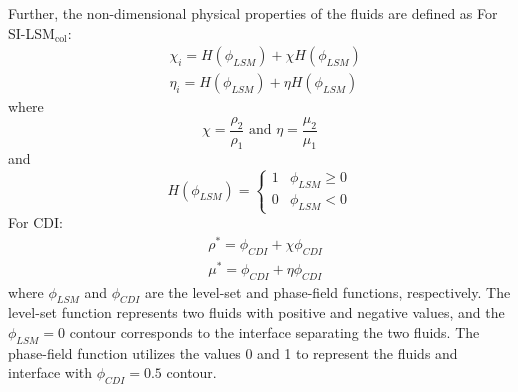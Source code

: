 \documentclass[a4paper,fleqn]{cas-sc}
\begin{document}
	Further, the non-dimensional physical properties of the fluids are defined as
	\newline
	\noindent For SI-LSM$_{\text{col}}$:  
	\begin{equation*}
		\begin{aligned}
			&\chi_{i}=H(\phi_{LSM}) + \chi H(\phi_{LSM})\\
			&\eta_{i}=H(\phi_{LSM}) + \eta H(\phi_{LSM})
		\end{aligned}
	\end{equation*}
	where
	\begin{equation*}
		\chi=\frac{\rho_2}{\rho_1}\text{ and }\eta=\frac{\mu_2}{\mu_1}
	\end{equation*}
	and
	\begin{equation*}
		H(\phi_{LSM})=\begin{cases}
			1&\phi_{LSM}\ge0\\
			0&\phi_{LSM}< 0
		\end{cases}
	\end{equation*}
	\newline
	\noindent For CDI:
	\begin{equation*}
		\begin{aligned}
			&\rho^{*}=\phi_{CDI} + \chi \phi_{CDI}\\
			&\mu^{*}=\phi_{CDI} + \eta \phi_{CDI}
		\end{aligned}
	\end{equation*}
	where $\phi_{LSM}$ and $\phi_{CDI}$ are the level-set and phase-field functions, respectively. The level-set function represents two fluids with positive and negative values, and the $\phi_{LSM}=0$ contour corresponds to the interface separating the two fluids. The phase-field function utilizes the values 0 and 1 to represent the fluids and interface with $\phi_{CDI}=0.5$ contour.
\end{document}
